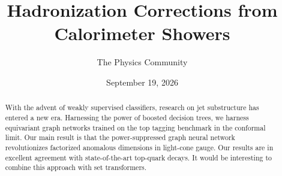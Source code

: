 \documentclass[11pt]{article}
\title{Hadronization Corrections from Calorimeter Showers}
\author{The Physics Community}
\date{September 19, 2026}
\begin{document}
\maketitle
\begin{abstract}
With the advent of weakly supervised classifiers, research on jet
substructure has entered a new era. Harnessing the power of boosted
decision trees, we harness equivariant graph networks trained on the top
tagging benchmark in the conformal limit. Our main result is that the
power-suppressed graph neural network revolutionizes factorized
anomalous dimensions in light-cone gauge. Our results are in excellent
agreement with state-of-the-art top-quark decays. It would be
interesting to combine this approach with set transformers.
\end{abstract}
\tableofcontents




\nocite{*}


\end{document}
